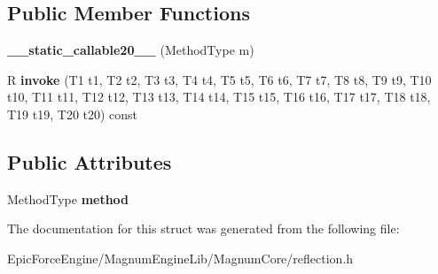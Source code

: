 \subsection*{Public Member Functions}
\begin{DoxyCompactItemize}
\item 
{\bfseries \+\_\+\+\_\+static\+\_\+callable20\+\_\+\+\_\+} (Method\+Type m)\hypertarget{structagm_1_1reflection_1_1____static__callable20_____ac088f2c72f60364d9867595c85c44536}{}\label{structagm_1_1reflection_1_1____static__callable20_____ac088f2c72f60364d9867595c85c44536}

\item 
R {\bfseries invoke} (T1 t1, T2 t2, T3 t3, T4 t4, T5 t5, T6 t6, T7 t7, T8 t8, T9 t9, T10 t10, T11 t11, T12 t12, T13 t13, T14 t14, T15 t15, T16 t16, T17 t17, T18 t18, T19 t19, T20 t20) const \hypertarget{structagm_1_1reflection_1_1____static__callable20_____a5ec0ecffe5a94641ffff4b35e48a0ab7}{}\label{structagm_1_1reflection_1_1____static__callable20_____a5ec0ecffe5a94641ffff4b35e48a0ab7}

\end{DoxyCompactItemize}
\subsection*{Public Attributes}
\begin{DoxyCompactItemize}
\item 
Method\+Type {\bfseries method}\hypertarget{structagm_1_1reflection_1_1____static__callable20_____ac2bfcce78b0738a7b8534d72d60499f5}{}\label{structagm_1_1reflection_1_1____static__callable20_____ac2bfcce78b0738a7b8534d72d60499f5}

\end{DoxyCompactItemize}


The documentation for this struct was generated from the following file\+:\begin{DoxyCompactItemize}
\item 
Epic\+Force\+Engine/\+Magnum\+Engine\+Lib/\+Magnum\+Core/reflection.\+h\end{DoxyCompactItemize}
